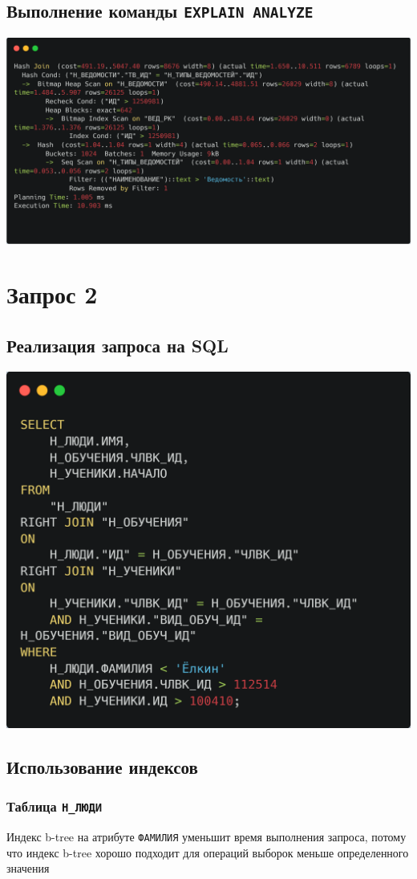 \documentclass[12pt]{article}
\begin{document}
	\subsection{Выполнение команды \texttt{EXPLAIN ANALYZE}}
	\includegraphics[width=\linewidth]{explain1}
	\newpage
	
	\section{Запрос 2}
	\subsection{Реализация запроса на SQL}
	\includegraphics[width=0.5\linewidth]{images/sql2}
	
	\subsection{Использование индексов}

	\subsubsection*{Таблица \texttt{Н_ЛЮДИ}}
	
	Индекс b-tree на атрибуте \texttt{ФАМИЛИЯ} уменьшит время выполнения запроса, потому что индекс b-tree хорошо подходит для операций выборок меньше определенного значения
\end{document}
